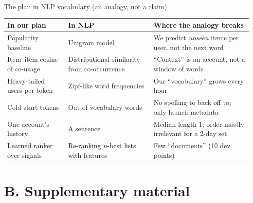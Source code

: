 \documentclass[aspectratio=169,10pt]{beamer}
\newcommand{\toindex}{\hfill\hyperlink{index}{\beamerreturnbutton{index}}}
\begin{document}
\begin{frame}[label=nlp]{The plan in NLP vocabulary (an analogy, not a claim) \toindex}
  \footnotesize
  \renewcommand{\arraystretch}{1.12}
  \begin{tabularx}{\textwidth}{@{}>{\raggedright\arraybackslash}p{3.6cm}>{\raggedright\arraybackslash}p{3.8cm}>{\raggedright\arraybackslash}X@{}}
    \toprule
    In our plan & In NLP & Where the analogy breaks \\
    \midrule
    Popularity baseline & Unigram model & We predict \emph{unseen} items per user, not the next word \\
    Item--item cosine of co-usage & Distributional similarity from co-occurrence \cite{churchhanks1990} & ``Context'' is an account, not a window of words \\
    Heavy-tailed users per token & Zipf-like word frequencies & Our ``vocabulary'' grows every hour \\
    Cold-start tokens & Out-of-vocabulary words & No spelling to back off to; only launch metadata \\
    One account's history & A sentence & Median length 1; order mostly irrelevant for a 2-day set \\
    Learned ranker over signals & Re-ranking $n$-best lists with features & Few ``documents'' (10 dev points) \\
    \bottomrule
  \end{tabularx}
\end{frame}

\section{B. Supplementary material}
\end{document}
